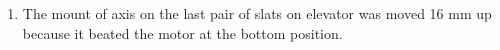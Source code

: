 \begin{enumerate}
\begin{enumerate}
        \item The mount of axis on the last pair of slats on elevator was moved 16 mm up because it beated the motor at the bottom position.
        \begin{figure}[H]
        	\begin{minipage}[h]{0.2\linewidth}
        		\center  
        	\end{minipage}
        	\begin{minipage}[h]{0.6\linewidth}
        		\caption{}
        	\end{minipage}
        \end{figure}
        

\end{enumerate}
\end{enumerate}
